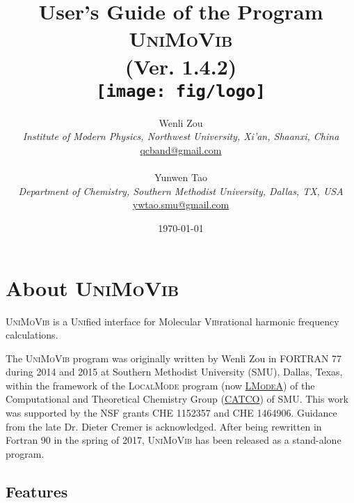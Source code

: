 \documentclass[12pt,english]{extarticle}
\begin{document}
\title{User's Guide of the Program \textsc{UniMoVib} \\
\vspace{10 mm} (Ver. 1.4.2) \vspace{30 mm} \\
\texttt{[image: fig/logo]} \vspace{30 mm} }

\date{\today}

\author{Wenli Zou \\
\textit{Institute of Modern Physics, Northwest University, Xi'an, Shaanxi, China} \\
\href{mailto:qcband@gmail.com}{qcband@gmail.com}
\\ \\
Yunwen Tao \\
\textit{Department of Chemistry, Southern Methodist University, Dallas, TX, USA} \\
\href{mailto:ywtao.smu@gmail.com}{ywtao.smu@gmail.com}
}

\maketitle
\setcounter{page}{0}
\thispagestyle{empty}

\pagebreak{}

\tableofcontents{}

\pagebreak{}

\section{About \textsc{UniMoVib}} \label{part:about}

\textsc{UniMoVib} is a \textsc{Uni}fied interface for \textsc{Mo}lecular \textsc{Vib}rational harmonic frequency calculations.

The \textsc{UniMoVib} program was originally written by Wenli Zou in FORTRAN 77 during 2014 and 2015 at Southern Methodist University (SMU), Dallas,
Texas, within the framework of the \textsc{LocalMode} program (now \href{https://sites.smu.edu/dedman/catco/}{\textsc{LModeA}}) of the Computational and Theoretical Chemistry Group (\href{https://sites.smu.edu/dedman/catco/}{CATCO}) of SMU. This work was
supported by the NSF grants CHE 1152357 and CHE 1464906. Guidance from the late Dr. Dieter Cremer is acknowledged. After being rewritten in Fortran 90 in the spring of 2017, \textsc{UniMoVib} has been released as a stand-alone program.

\subsection{Features} \label{sec:feature}
\end{document}
